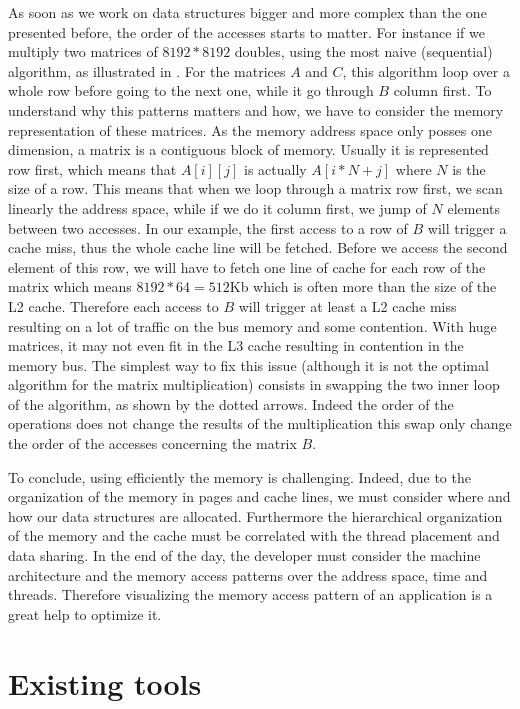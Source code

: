 As soon as we work on data structures bigger and more complex than the one presented before, the order of the accesses starts to matter.
For instance if we multiply two matrices of $8192*8192$ doubles, using the most naive (sequential) algorithm, as illustrated in .
For the matrices $A$ and $C$, this algorithm loop over a whole row before going to the next one, while it go through $B$ column first.
To understand why this patterns matters and how, we have to consider the memory representation of these matrices.
As the memory address space only posses one dimension, a matrix is a contiguous block of memory.
Usually it is represented row first, which means that $A[i][j]$ is actually $A[i*N+j]$ where $N$ is the size of a row.
This means that when we loop through a matrix row first, we scan linearly the address space, while if we do it column first, we jump of $N$ elements between two accesses.
In our example, the first access to a row of $B$ will trigger a cache miss, thus the whole cache line will be fetched.
Before we access the second element of this row, we will have to fetch one line of cache for each row of the matrix which means $8192*64=512$Kb which is often more than the size of the L2 cache.
Therefore each access to $B$ will trigger at least a L2 cache miss resulting on a lot of traffic on the bus memory and some contention.
With huge matrices, it may not even fit in the L3 cache resulting in contention in the memory bus.
The simplest way to fix this issue (although it is not the optimal algorithm for the matrix multiplication) consists in swapping the two inner loop of the algorithm, as shown by the dotted arrows.
Indeed the order of the operations does not change the results of the multiplication this swap only change the order of the accesses concerning the matrix $B$.

To conclude, using efficiently the memory is challenging.
Indeed, due to the organization of the memory in pages and cache lines, we must consider where and how our data structures are allocated.
Furthermore the hierarchical organization of the memory and the cache must be correlated with the thread placement and data sharing.
In the end of the day, the developer must consider the machine architecture and the memory access patterns over the address space, time and threads.
Therefore visualizing the memory access pattern of an application is a great help to optimize it.

\section{Existing tools}
\label{sec:mem-tools}

